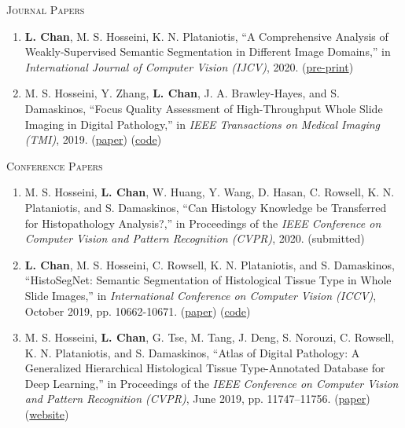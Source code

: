 \documentclass[11pt]{cv_style}
\begin{document}
\textsc{Journal Papers}
\begin{enumerate}
	\item \textbf{L. Chan}, M. S. Hosseini, K. N. Plataniotis, ``A Comprehensive Analysis of Weakly-Supervised Semantic Segmentation in Different Image Domains,'' in \emph{International Journal of Computer Vision (IJCV)}, 2020. (\href{https://arxiv.org/pdf/1912.11186.pdf}{pre-print})
	\item M. S. Hosseini, Y. Zhang, \textbf{L. Chan}, J. A. Brawley-Hayes, and S. Damaskinos, ``Focus Quality Assessment of High-Throughput Whole Slide Imaging in Digital Pathology,'' in \emph{IEEE Transactions on Medical Imaging (TMI)}, 2019. (\href{https://ieeexplore.ieee.org/abstract/document/8725582}{paper}) (\href{https://github.com/mahdihosseini/FQPath}{code})
\end{enumerate}
\newpage
\textsc{Conference Papers}
\begin{enumerate}
	\item M. S. Hosseini, \textbf{L. Chan}, W. Huang, Y. Wang, D. Hasan, C. Rowsell, K. N. Plataniotis, and S. Damaskinos, ``Can Histology Knowledge be Transferred for Histopathology Analysis?,'' in Proceedings of the \emph{IEEE Conference on Computer Vision and Pattern Recognition (CVPR)}, 2020. (submitted)
	\item \textbf{L. Chan}, M. S. Hosseini, C. Rowsell, K. N. Plataniotis, and S. Damaskinos, ``HistoSegNet: Semantic Segmentation of Histological Tissue Type in Whole Slide Images,'' in \emph{International Conference on Computer Vision (ICCV)}, October 2019, pp. 10662-10671. (\href{http://openaccess.thecvf.com/content_ICCV_2019/papers/Chan_HistoSegNet_Semantic_Segmentation_of_Histological_Tissue_Type_in_Whole_Slide_ICCV_2019_paper.pdf}{paper}) (\href{https://github.com/lyndonchan/hsn_v1}{code})
	\item M. S. Hosseini, \textbf{L. Chan}, G. Tse, M. Tang, J. Deng, S. Norouzi, C. Rowsell, K. N. Plataniotis, and S. Damaskinos, ``Atlas of Digital Pathology: A Generalized Hierarchical Histological Tissue Type-Annotated Database for Deep Learning,'' in Proceedings of the \emph{IEEE Conference on Computer Vision and Pattern Recognition (CVPR)}, June 2019, pp. 11747–11756. (\href{http://openaccess.thecvf.com/content_CVPR_2019/html/Hosseini_Atlas_of_Digital_Pathology_A_Generalized_Hierarchical_Histological_Tissue_Type-Annotated_CVPR_2019_paper.html}{paper}) (\href{http://www.dsp.utoronto.ca/projects/ADP/}{website})
\end{enumerate}
\end{document}
